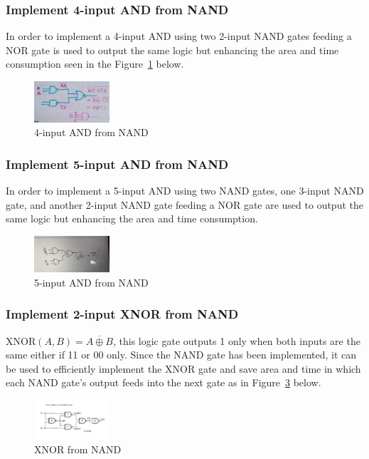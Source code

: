 \documentclass[conference]{IEEEtran}
\begin{document}
\subsubsection{Implement 4-input AND from NAND}
In order to implement a 4-input AND using two 2-input NAND gates feeding a NOR gate is used to output the same logic but enhancing the area and time consumption seen in the Figure~\ref{fig:4inputANDfromNAND} below.
\begin{figure}[h]
    \centering
    \includegraphics[width=0.25\textwidth]{assets/4inputANDfromNAND.png}
    \caption{4-input AND from NAND}
    \label{fig:4inputANDfromNAND}
\end{figure}
\subsubsection{Implement 5-input AND from NAND}
In order to implement a 5-input AND using two NAND gates, one 3-input NAND gate, and another 2-input NAND gate feeding a NOR gate are used to output the same logic but enhancing the area and time consumption.
\begin{figure}[h]
    \centering
    \includegraphics[width=0.25\textwidth]{assets/5inputANDfromNAND.jpg}
    \caption{5-input AND from NAND}
    \label{fig:5inputANDfromNAND}
\end{figure}
\subsubsection{Implement 2-input XNOR from NAND}
\( \text{XNOR}(A, B) = \overline{A \oplus B} \), this logic gate outputs 1 only when both inputs are the same either if 11 or 00 only. Since the NAND gate has been implemented, it can be used to efficiently implement the XNOR gate and save area and time in which each NAND gate's output feeds into the next gate as in Figure~\ref{fig:XNORfromNAND} below.
\begin{figure}[h]
    \centering
    \includegraphics[width=0.25\textwidth]{assets/XNORfromNAND.jpg}
    \caption{XNOR from NAND}
    \label{fig:XNORfromNAND}
\end{figure}
\end{document}
